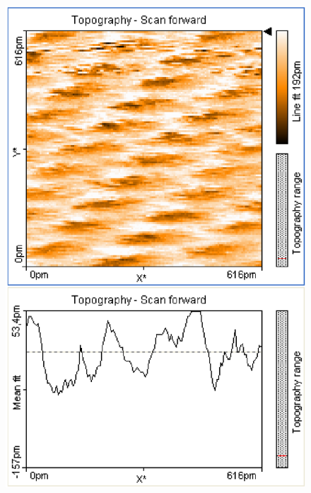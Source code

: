 \documentclass[12pt]{article}
\begin{document}
\begin{figure}[H]
\begin{minipage}{0.4\linewidth}
\includegraphics[width=0.9\linewidth]{../plot/data/graphit/graphit4.eps}
\end{minipage}
\end{figure}
\end{document}
